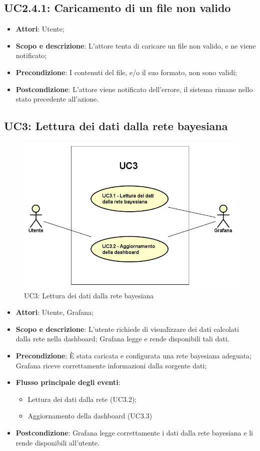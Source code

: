 \subsection{UC2.4.1: Caricamento di un file non valido}
\hypertarget{UC2.4.1}{}
\begin{itemize}
	\item \textbf{Attori}: Utente;
	\item \textbf{Scopo e descrizione}: L'attore tenta di caricare un file non valido, e ne viene notificato;
	\item \textbf{Precondizione}: I contenuti del file, e/o il suo formato, non sono validi;
	\item \textbf{Postcondizione}: L'attore viene notificato dell'errore, il sistema rimane nello stato precedente all'azione.
\end{itemize}

\subsection{UC3: Lettura dei dati dalla rete bayesiana}
\hypertarget{UC3}{}
\begin{figure} [H]
	\centering
	\includegraphics[scale=0.45]{Img/UC3}
	\caption{UC3: Lettura dei dati dalla rete bayesiana}\label{}
\end{figure}
\begin{itemize}
	\item \textbf{Attori}: Utente, Grafana;
	\item \textbf{Scopo e descrizione}: L'utente richiede di visualizzare dei dati calcolati dalla rete nella dashboard; Grafana legge e rende disponibili tali dati.
	\item \textbf{Precondizione}: È stata caricata e configurata una rete bayesiana adeguata; Grafana riceve correttamente informazioni dalla sorgente dati;
	\item \textbf{Flusso principale degli eventi}:
	\begin{itemize}
		\item Lettura dei dati dalla rete (UC3.2);
		\item Aggiornamento della dashboard (UC3.3)
	\end{itemize}
	\item \textbf{Postcondizione}: Grafana legge correttamente i dati dalla rete bayesiana e li rende disponibili all'utente.
\end{itemize}
